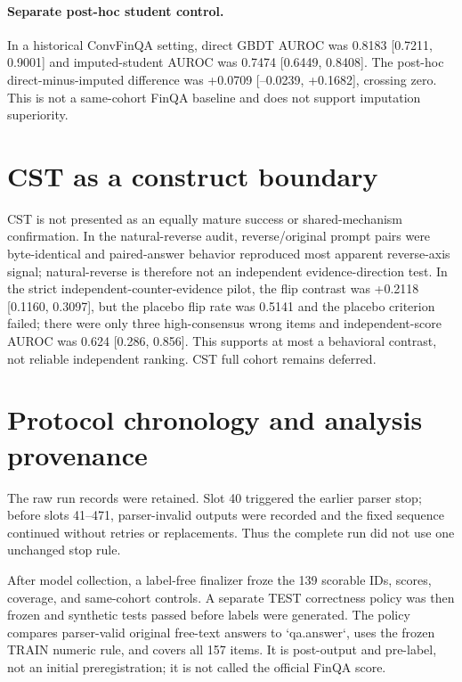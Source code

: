 \documentclass[11pt]{article}
\begin{document}
\paragraph{Separate post-hoc student control.} In a historical ConvFinQA setting, direct GBDT AUROC was 0.8183 [0.7211, 0.9001] and imputed-student AUROC was 0.7474 [0.6449, 0.8408]. The post-hoc direct-minus-imputed difference was +0.0709 [--0.0239, +0.1682], crossing zero. This is not a same-cohort FinQA baseline and does not support imputation superiority.

\section{CST as a construct boundary}
CST is not presented as an equally mature success or shared-mechanism confirmation. In the natural-reverse audit, reverse/original prompt pairs were byte-identical and paired-answer behavior reproduced most apparent reverse-axis signal; natural-reverse is therefore not an independent evidence-direction test. In the strict independent-counter-evidence pilot, the flip contrast was +0.2118 [0.1160, 0.3097], but the placebo flip rate was 0.5141 and the placebo criterion failed; there were only three high-consensus wrong items and independent-score AUROC was 0.624 [0.286, 0.856]. This supports at most a behavioral contrast, not reliable independent ranking. CST full cohort remains deferred.

\section{Protocol chronology and analysis provenance}
The raw run records were retained. Slot 40 triggered the earlier parser stop; before slots 41--471, parser-invalid outputs were recorded and the fixed sequence continued without retries or replacements. Thus the complete run did not use one unchanged stop rule.

After model collection, a label-free finalizer froze the 139 scorable IDs, scores, coverage, and same-cohort controls. A separate TEST correctness policy was then frozen and synthetic tests passed before labels were generated. The policy compares parser-valid original free-text answers to `qa.answer`, uses the frozen TRAIN numeric rule, and covers all 157 items. It is post-output and pre-label, not an initial preregistration; it is not called the official FinQA score.
\end{document}
